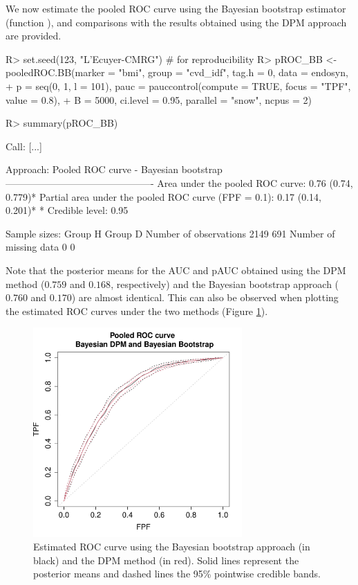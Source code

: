 We now estimate the pooled ROC curve using the Bayesian bootstrap estimator (function ), and comparisons with the results obtained using the DPM approach are provided.

\begin{example}
R> set.seed(123, "L'Ecuyer-CMRG") # for reproducibility
R> pROC_BB <- pooledROC.BB(marker = "bmi", group = "cvd_idf", tag.h = 0, data = endosyn, 
+ p = seq(0, 1, l = 101), pauc = pauccontrol(compute = TRUE, focus = "TPF", value = 0.8), 
+ B = 5000, ci.level = 0.95, parallel = "snow", ncpus = 2)
		
R> summary(pROC_BB)

Call: [...]
		
Approach: Pooled ROC curve - Bayesian bootstrap
----------------------------------------------
Area under the pooled ROC curve: 0.76 (0.74, 0.779)*
Partial area under the pooled ROC curve (FPF = 0.1): 0.17 (0.14, 0.201)*
 * Credible level:  0.95

Sample sizes:
                           Group H     Group D
Number of observations        2149         691
Number of missing data           0           0
\end{example}
Note that the posterior means for the AUC and pAUC obtained using the DPM method ($0.759$ and $0.168$, respectively) and the Bayesian bootstrap approach ($0.760$ and $0.170$) are almost identical. This can also be observed when plotting the estimated ROC curves under the two methods (Figure \ref{pooled_ROC_dpm_BB}).
\begin{figure}[ht!]
\begin{center}
\includegraphics[width=8cm]{pooled_ROC_dpm_BB.pdf}
\end{center}
\caption{Estimated ROC curve using the Bayesian bootstrap approach (in black) and the DPM method (in red). Solid lines represent the posterior means and dashed lines the 95\% pointwise credible bands.}
\label{pooled_ROC_dpm_BB}
\end{figure}

